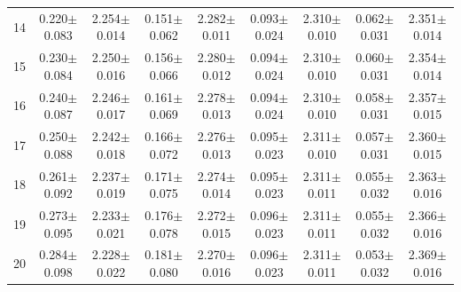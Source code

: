 \begin{table}[H]
{\begin{tabular}{c cc cc cc cc}
14 & 0.220$\pm$0.083 & 2.254$\pm$0.014 & 0.151$\pm$0.062 & 2.282$\pm$0.011 & 0.093$\pm$0.024 & 2.310$\pm$0.010 & 0.062$\pm$0.031 & 2.351$\pm$0.014 \\
15 & 0.230$\pm$0.084 & 2.250$\pm$0.016 & 0.156$\pm$0.066 & 2.280$\pm$0.012 & 0.094$\pm$0.024 & 2.310$\pm$0.010 & 0.060$\pm$0.031 & 2.354$\pm$0.014 \\
16 & 0.240$\pm$0.087 & 2.246$\pm$0.017 & 0.161$\pm$0.069 & 2.278$\pm$0.013 & 0.094$\pm$0.024 & 2.310$\pm$0.010 & 0.058$\pm$0.031 & 2.357$\pm$0.015 \\
17 & 0.250$\pm$0.088 & 2.242$\pm$0.018 & 0.166$\pm$0.072 & 2.276$\pm$0.013 & 0.095$\pm$0.023 & 2.311$\pm$0.010 & 0.057$\pm$0.031 & 2.360$\pm$0.015 \\
18 & 0.261$\pm$0.092 & 2.237$\pm$0.019 & 0.171$\pm$0.075 & 2.274$\pm$0.014 & 0.095$\pm$0.023 & 2.311$\pm$0.011 & 0.055$\pm$0.032 & 2.363$\pm$0.016 \\
19 & 0.273$\pm$0.095 & 2.233$\pm$0.021 & 0.176$\pm$0.078 & 2.272$\pm$0.015 & 0.096$\pm$0.023 & 2.311$\pm$0.011 & 0.055$\pm$0.032 & 2.366$\pm$0.016 \\
20 & 0.284$\pm$0.098 & 2.228$\pm$0.022 & 0.181$\pm$0.080 & 2.270$\pm$0.016 & 0.096$\pm$0.023 & 2.311$\pm$0.011 & 0.053$\pm$0.032 & 2.369$\pm$0.016 \\

\bottomrule

\end{tabular}
}
\end{table}

